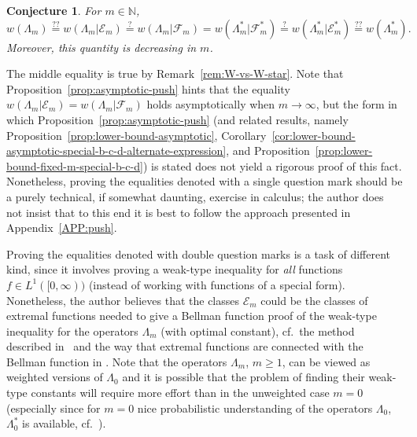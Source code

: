 \documentclass[a4paper]{amsart} %
\newtheorem{conjecture}[theorem]{Conjecture} %
\theoremstyle{definition}
\theoremstyle{remark}
\numberwithin{equation}{section}
\newcommand*{\LongArxivOrShortJournalVersion}[2]{#1}
\newcommand*{\NNone}{\mathbb{N}}
\newcommand*{\weakconst}[1]{w(#1)} %
\newcommand*{\weakconstrestricted}[2]{w(#1|#2)} %
\newcommand*{\fclass}[1]{\mathcal{E}_{#1}}
\newcommand*{\fclassspec}[1]{\mathcal{F}_{#1}}
\newcommand*{\fclassStar}[1]{\mathcal{E}_{#1}^*}
\newcommand*{\fclassspecStar}[1]{\mathcal{F}_{#1}^*}
\begin{document}
\begin{conjecture}
	\label{conj:mine}
For $m\in\NNone$,
\[
\weakconst{\Lambda_m} 
\overset{??}{=} \weakconstrestricted{\Lambda_m}{\fclass{m}}
\overset{?}{=} \weakconstrestricted{\Lambda_m}{\fclassspec{m}}
= \weakconstrestricted{\Lambda_m^*}{\fclassspecStar{m}}	 
\overset{?}{=} \weakconstrestricted{\Lambda_m^*}{\fclassStar{m}} 
\overset{??}{=} \weakconst{\Lambda_m^*}.
\]
Moreover, this quantity is decreasing in $m$.
\end{conjecture}

\LongArxivOrShortJournalVersion{%
The middle equality is true by Remark~\ref{rem:W-vs-W-star}.
Note that Proposition~\ref{prop:asymptotic-push} 
hints that the equality $\weakconstrestricted{\Lambda_m}{\fclass{m}}
= \weakconstrestricted{\Lambda_m}{\fclassspec{m}}$
holds asymptotically when $m\to\infty$,
but the form in which Proposition~\ref{prop:asymptotic-push}  (and related results, namely
Proposition~\ref{prop:lower-bound-asymptotic}, Corollary~\ref{cor:lower-bound-asymptotic-special-b-c-d-alternate-expression}, and  Proposition~\ref{prop:lower-bound-fixed-m-special-b-c-d})
 is stated does not yield a rigorous proof of this fact.
 Nonetheless, proving the equalities denoted with a single question mark
 should be a purely technical, if somewhat daunting, exercise in calculus;
 the author does not insist that to this end it is best to follow the approach presented in Appendix~\ref{APP:push}.}{%
The middle equality is true by Remark~\ref{rem:W-vs-W-star}.
Proposition~C.3 in the arXiv version of this article suggests that
the equality $\weakconstrestricted{\Lambda_m}{\fclass{m}}
= \weakconstrestricted{\Lambda_m}{\fclassspec{m}}$ holds asymptotically when $m\to \infty$;
proving the equalities denoted with a single question mark
 should be a purely technical, if somewhat daunting, exercise in calculus (cf.\  Appendix~D in the arXiv version of this article).}

Proving the equalities denoted with double question marks
is a task of different kind, since it involves proving a weak-type inequality
for \emph{all} functions $f\in L^1([0,\infty))$
(instead of working with functions of a special form).
Nonetheless, the author believes that the classes $\fclass{m}$
could be the classes of extremal functions 
needed to give a Bellman function proof of the weak-type inequality for the operators $\Lambda_m$ 
(with optimal constant), cf.\ the method described in~\cite{MR3306045} 
and the way that extremal functions are connected with the Bellman function in \cite{MR3558516,MR4088501}.
Note that the operators $\Lambda_m$, $m\geq 1$,
can be viewed as weighted versions of $\Lambda_0$ and
it is possible that the problem of finding their weak-type constants 
will require more effort than in the unweighted case $m=0$
(especially since for $m=0$ nice probabilistic understanding of the operators $\Lambda_0$, $\Lambda_0^*$ is available, cf.\ \cite{MR3018958,MR3189475,MR3558516}).
\end{document}
